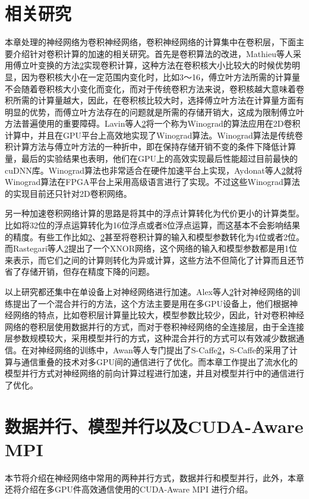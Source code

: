 \section{相关研究}
\label{relatedwork}
本章处理的神经网络为卷积神经网络，卷积神经网络的计算集中在卷积层，下面主要介绍针对卷积计算的加速的相关研究。首先是卷积算法的改进，Mathieu等人采用傅立叶变换的方法\ref{}实现卷积计算，这种方法在卷积核大小比较大的时候优势明显，因为卷积核大小在一定范围内变化时，比如3～16，傅立叶方法所需的计算量不会随着卷积核大小变化而变化，而对于传统卷积方法来说，卷积核越大意味着卷积所需的计算量越大，因此，在卷积核比较大时，选择傅立叶方法在计算量方面有明显的优势，而傅立叶方法存在的问题就是所需的存储开销大，这成为限制傅立叶方法普遍使用的重要障碍。Lavin等人\ref{}将一个称为Winograd的算法应用在2D卷积计算中，并且在GPU平台上高效地实现了Winograd算法。Winograd算法是传统卷积计算方法与傅立叶方法的一种折中，即在保持存储开销不变的条件下降低计算量，最后的实验结果也表明，他们在GPU上的高效实现最后性能超过目前最快的cuDNN库。Winograd算法也非常适合在硬件加速平台上实现，Aydonat等人\ref{}就将Winograd算法在FPGA平台上采用高级语言进行了实现。不过这些Winograd算法的实现目前还只针对2D卷积网络。

另一种加速卷积网络计算的思路是将其中的浮点计算转化为代价更小的计算类型。比如将32位的浮点运算转化为16位浮点或者8位浮点运算，而这基本不会影响结果的精度。有些工作比如\ref{}、\ref{}甚至将卷积计算的输入和模型参数转化为4位或者2位。而Rastegari等人\ref{}提出了一个XNOR网络，这个网络的输入和模型参数都是用1位来表示，而它们之间的计算则转化为异或计算，这些方法不但简化了计算而且还节省了存储开销，但存在精度下降的问题。

以上研究都还集中在单设备上对神经网络进行加速。Alex等人\ref{}针对神经网络的训练提出了一个混合并行的方法，这个方法主要是用在多GPU设备上，他们根据神经网络的特点，比如卷积层计算量比较大，模型参数比较少，因此，针对卷积神经网络的卷积层使用数据并行的方式，而对于卷积神经网络的全连接层，由于全连接层参数规模较大，采用模型并行的方式，这种混合并行的方式可以有效减少数据通信。在对神经网络的训练中，Awan等人专门提出了S-Caffe\ref{}，S-Caffe的采用了计算与通信重叠的技术对多GPU间的通信进行了优化。而本章工作提出了流水化的模型并行方式对神经网络的前向计算过程进行加速，并且对模型并行中的通信进行了优化。

\section{数据并行、模型并行以及CUDA-Aware MPI}
本节将介绍在神经网络中常用的两种并行方式，数据并行和模型并行，此外，本章还将介绍在多GPU件高效通信使用的CUDA-Aware MPI 进行介绍。

